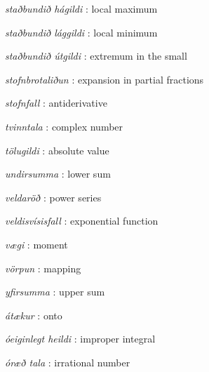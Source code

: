 \documentclass[b5paper,10pt,icelandic]{sphinxmanual}
\begin{document}
\emph{staðbundið hágildi} : local maximum

\emph{staðbundið lággildi} : local minimum

\emph{staðbundið útgildi} : extremum in the small

\emph{stofnbrotaliðun} : expansion in partial fractions

\emph{stofnfall} : antiderivative

\emph{tvinntala} : complex number


\emph{tölugildi} : absolute value

\emph{undirsumma} : lower sum


\emph{veldaröð} : power series


\emph{veldisvísisfall} : exponential function


\emph{vægi} : moment

\emph{vörpun} : mapping

\emph{yfirsumma} : upper sum


\emph{átækur} : onto

\emph{óeiginlegt heildi} : improper integral


\emph{óræð tala} : irrational number

\cleardoublepage
\printindex
\end{document}
